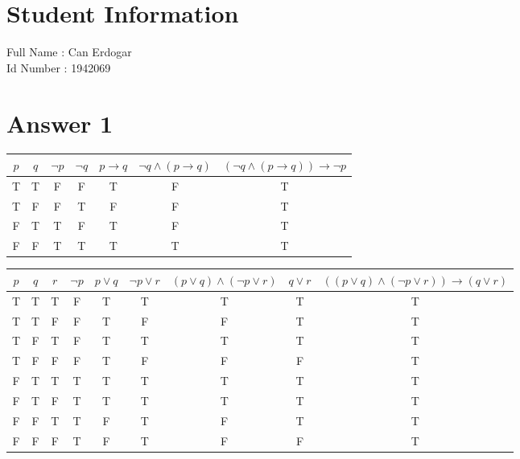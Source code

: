 \documentclass[12pt]{article}
\begin{document}
\section*{Student Information } 
Full Name :  Can Erdogar \\
Id Number :  1942069 \\

\section*{Answer 1}


\begin{table}[H]
	\small
	\centering
	\label{Q1-A}
	\begin{tabular}{|c|c|c|c|c|c|c|}	%
	\hline 							%
	\textbf{$p$} & \textbf{$q$} & \textbf{$\neg p$} & \textbf{$\neg q$} & \textbf{$p \rightarrow q$} & \textbf{$\neg q \wedge (p \rightarrow q)$} &\textbf{$(\neg q \wedge (p \rightarrow q)) \rightarrow \neg p$}\\
	\hline 
	\hline 
	T & T & F & F & T & F & T \\			%
	T & F & F & T & F & F & T \\
	F & T & T & F & T & F & T \\
	F & F & T & T & T & T & T \\
	\hline 

	\end{tabular}
\end{table}


\begin{table}[H]
\small
\centering
\label{Q1-B}
\begin{tabular}{|c|c|c|c|c|c|c|c|c|}	%
\hline 							%
\textbf{$p$} & \textbf{$q$} & \textbf{$r$} & \textbf{$\neg p$} & \textbf{$p \vee q$} & \textbf{$\neg p \vee r$} &\textbf{$(p \vee q) \wedge (\neg p \vee r)$} & \textbf{$q \vee r$} & \textbf{$((p \vee q) \wedge (\neg p \vee r)) \rightarrow (q \vee r)$}\\
\hline 
\hline 
T & T & T & F & T & T & T & T & T \\			%
T & T & F & F & T & F & F & T & T \\
T & F & T & F & T & T & T & T & T \\
T & F & F & F & T & F & F & F & T \\
F & T & T & T & T & T & T & T & T \\
F & T & F & T & T & T & T & T & T \\
F & F & T & T & F & T & F & T & T \\
F & F & F & T & F & T & F & F & T \\
\hline 
\end{tabular}
\end{table}
\end{document}
